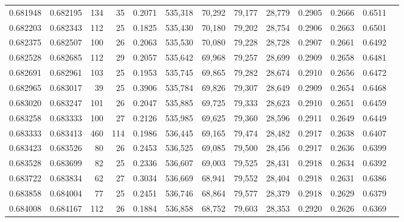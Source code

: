 \begin{tabular}{rrrrrrrrrrrrr}
0.681948 & 0.682195 &    134 &    35 &                                     0.2071 & 535,318 &  70,292 &  79,177 &  28,779 & 0.2905 & 0.2666 & 0.6511 \\
0.682203 & 0.682343 &    112 &    25 &                                     0.1825 & 535,430 &  70,180 &  79,202 &  28,754 & 0.2906 & 0.2663 & 0.6501 \\
0.682375 & 0.682507 &    100 &    26 &                                     0.2063 & 535,530 &  70,080 &  79,228 &  28,728 & 0.2907 & 0.2661 & 0.6492 \\
0.682528 & 0.682685 &    112 &    29 &                                     0.2057 & 535,642 &  69,968 &  79,257 &  28,699 & 0.2909 & 0.2658 & 0.6481 \\
0.682691 & 0.682961 &    103 &    25 &                                     0.1953 & 535,745 &  69,865 &  79,282 &  28,674 & 0.2910 & 0.2656 & 0.6472 \\
0.682965 & 0.683017 &     39 &    25 &                                     0.3906 & 535,784 &  69,826 &  79,307 &  28,649 & 0.2909 & 0.2654 & 0.6468 \\
0.683020 & 0.683247 &    101 &    26 &                                     0.2047 & 535,885 &  69,725 &  79,333 &  28,623 & 0.2910 & 0.2651 & 0.6459 \\
0.683258 & 0.683333 &    100 &    27 &                                     0.2126 & 535,985 &  69,625 &  79,360 &  28,596 & 0.2911 & 0.2649 & 0.6449 \\
0.683333 & 0.683413 &    460 &   114 &                                     0.1986 & 536,445 &  69,165 &  79,474 &  28,482 & 0.2917 & 0.2638 & 0.6407 \\
0.683423 & 0.683526 &     80 &    26 &                                     0.2453 & 536,525 &  69,085 &  79,500 &  28,456 & 0.2917 & 0.2636 & 0.6399 \\
0.683528 & 0.683699 &     82 &    25 &                                     0.2336 & 536,607 &  69,003 &  79,525 &  28,431 & 0.2918 & 0.2634 & 0.6392 \\
0.683722 & 0.683834 &     62 &    27 &                                     0.3034 & 536,669 &  68,941 &  79,552 &  28,404 & 0.2918 & 0.2631 & 0.6386 \\
0.683858 & 0.684004 &     77 &    25 &                                     0.2451 & 536,746 &  68,864 &  79,577 &  28,379 & 0.2918 & 0.2629 & 0.6379 \\
0.684008 & 0.684167 &    112 &    26 &                                     0.1884 & 536,858 &  68,752 &  79,603 &  28,353 & 0.2920 & 0.2626 & 0.6369 \\

\end{tabular}
